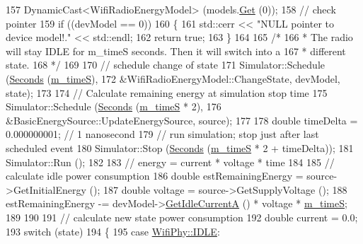 \begin{DoxyCode}
157     DynamicCast<WifiRadioEnergyModel> (models.\hyperlink{classns3_1_1DeviceEnergyModelContainer_ab7b49acea017b91801a4e7067db56eba}{Get} (0));
158   \textcolor{comment}{// check pointer}
159   \textcolor{keywordflow}{if} ((devModel == 0))
160     \{
161       std::cerr << \textcolor{stringliteral}{"NULL pointer to device model!."} << std::endl;
162       \textcolor{keywordflow}{return} \textcolor{keyword}{true};
163     \}
164 
165   \textcolor{comment}{/*}
166 \textcolor{comment}{   * The radio will stay IDLE for m\_timeS seconds. Then it will switch into a}
167 \textcolor{comment}{   * different state.}
168 \textcolor{comment}{   */}
169 
170   \textcolor{comment}{// schedule change of state}
171   Simulator::Schedule (\hyperlink{group__timecivil_ga33c34b816f8ff6628e33d5c8e9713b9e}{Seconds} (\hyperlink{classBasicEnergyUpdateTest_a4db29015c7b28c1b861621098e79cfe5}{m\_timeS}),
172                        &WifiRadioEnergyModel::ChangeState, devModel, state);
173 
174   \textcolor{comment}{// Calculate remaining energy at simulation stop time}
175   Simulator::Schedule (\hyperlink{group__timecivil_ga33c34b816f8ff6628e33d5c8e9713b9e}{Seconds} (\hyperlink{classBasicEnergyUpdateTest_a4db29015c7b28c1b861621098e79cfe5}{m\_timeS} * 2), 
176                        &BasicEnergySource::UpdateEnergySource, source);
177 
178   \textcolor{keywordtype}{double} timeDelta = 0.000000001; \textcolor{comment}{// 1 nanosecond}
179   \textcolor{comment}{// run simulation; stop just after last scheduled event}
180   Simulator::Stop (\hyperlink{group__timecivil_ga33c34b816f8ff6628e33d5c8e9713b9e}{Seconds} (\hyperlink{classBasicEnergyUpdateTest_a4db29015c7b28c1b861621098e79cfe5}{m\_timeS} * 2 + timeDelta));
181   Simulator::Run ();
182 
183   \textcolor{comment}{// energy = current * voltage * time}
184 
185   \textcolor{comment}{// calculate idle power consumption}
186   \textcolor{keywordtype}{double} estRemainingEnergy = source->GetInitialEnergy ();
187   \textcolor{keywordtype}{double} voltage = source->GetSupplyVoltage ();
188   estRemainingEnergy -= devModel->\hyperlink{classns3_1_1WifiRadioEnergyModel_a50648b907f718a5dce9f3c390dcae9ca}{GetIdleCurrentA} () * voltage * 
      \hyperlink{classBasicEnergyUpdateTest_a4db29015c7b28c1b861621098e79cfe5}{m\_timeS};
189 
190 
191   \textcolor{comment}{// calculate new state power consumption}
192   \textcolor{keywordtype}{double} current = 0.0;
193   \textcolor{keywordflow}{switch} (state)
194     \{
195     \textcolor{keywordflow}{case} \hyperlink{namespacens3_aff37503a9e9f2dbe82b374050a73e105acb448301f46bfb634e8e803a6fd21264}{WifiPhy::IDLE}:

\end{DoxyCode}
